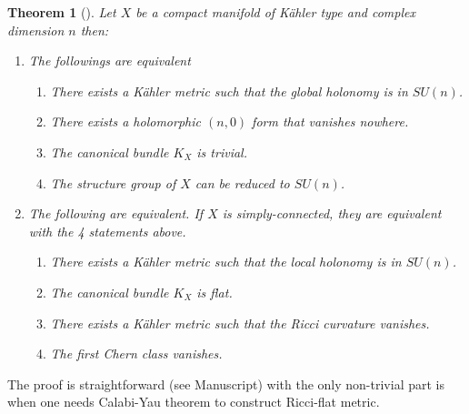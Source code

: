 \documentclass[11pt]{article}
\newtheorem{theorem}{Theorem}
\begin{document}
\begin{theorem}[]
Let \(X\) be a compact manifold of Kähler type and complex dimension \(n\) then:
\begin{enumerate}
\item The followings are equivalent
\begin{enumerate}
\item There exists a Kähler metric such that the global holonomy is in \(SU(n)\).
\item There exists a holomorphic \((n,0)\) form that vanishes nowhere.
\item The canonical bundle \(K_X\) is trivial.
\item The structure group of \(X\) can be reduced to \(SU(n)\).
\end{enumerate}
\item The following are equivalent. If \(X\) is simply-connected, they are equivalent with the 4
statements above.
\begin{enumerate}
\item There exists a Kähler metric such that the local holonomy is in \(SU(n)\).
\item The canonical bundle \(K_X\) is flat.
\item There exists a Kähler metric such that the Ricci curvature vanishes.
\item The first Chern class vanishes.
\end{enumerate}
\end{enumerate}
\end{theorem}

The proof is straightforward (see Manuscript) with the only non-trivial part is when one needs Calabi-Yau theorem to
construct Ricci-flat metric.
\end{document}

